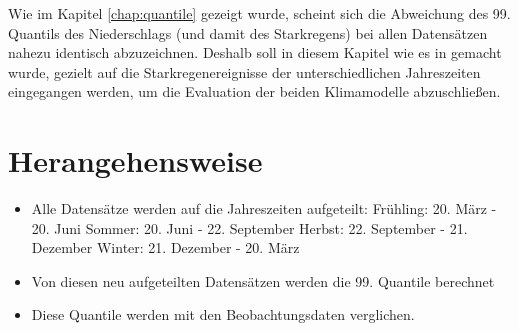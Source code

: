 Wie im Kapitel \ref{chap:quantile} gezeigt wurde, scheint sich die Abweichung des 99. Quantils des Niederschlags (und damit des Starkregens) bei allen Datensätzen nahezu identisch abzuzeichnen. Deshalb soll in diesem Kapitel wie es in \cite{biasMaraun} gemacht wurde, gezielt auf die Starkregenereignisse der unterschiedlichen Jahreszeiten eingegangen werden, um die Evaluation der beiden Klimamodelle abzuschließen.
\section{Herangehensweise}\label{sec:Herangehensweise}
\begin{itemize}
\item Alle Datensätze werden auf die Jahreszeiten aufgeteilt:
	\subitem Frühling: 20. März - 20. Juni
	\subitem Sommer: 20. Juni - 22. September
	\subitem Herbst: 22. September - 21. Dezember
	\subitem Winter: 21. Dezember - 20. März
\item Von diesen neu aufgeteilten Datensätzen werden die 99. Quantile berechnet
\item Diese Quantile werden mit den Beobachtungsdaten verglichen.
\end{itemize}

